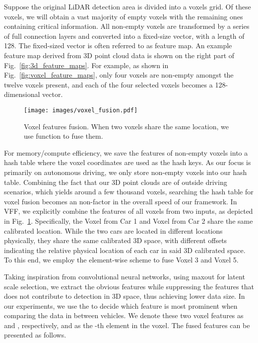 \documentclass[sigconf]{acmart}
\begin{document}
Suppose the original LiDAR detection area is divided into a voxels grid. Of these voxels, we will obtain a vast majority of empty voxels with the remaining ones containing critical information.
All non-empty voxels are transformed by a series of full connection layers and converted into a fixed-size vector, with a length of 128. 
The fixed-sized vector is often referred to as feature map.
An example feature map derived from 3D point cloud data is shown on the right part of Fig.~\ref{fig:3d_feature_maps}.
For example, as shown in Fig.~\ref{fig:voxel_feature_maps}, only four voxels are non-empty amongst the twelve voxels present, and each of the four selected voxels becomes a 128-dimensional vector.


\vspace{-11pt}
\begin{figure}[!h]
    \centering
    \texttt{[image: images/voxel\_fusion.pdf]}
    \caption{Voxel features fusion. When two voxels share the same location, we use  function to fuse them. }
    \vspace{-11pt}
    \label{fig:voxel_fusion}
\end{figure}


For memory/compute efficiency, we save the features of non-empty voxels into a hash table where the voxel coordinates are used as the hash keys. As our focus is primarily on autonomous driving, we only store non-empty voxels into our hash table. Combining the fact that our 3D point clouds are of outside driving scenarios, which yields around a few thousand voxels, searching the hash table for voxel fusion becomes an non-factor in the overall speed of our framework. 
In VFF, we explicitly combine the features of all voxels from two inputs, as depicted in Fig.~\ref{fig:voxel_fusion}.
Specifically, the Voxel  from Car 1 and Voxel  from Car 2 share the same calibrated location. 
While the two cars are located in different locations physically, they share the same calibrated 3D space, with different offsets indicating the relative physical location of each car in said 3D calibrated space.
To this end, we employ the element-wise  scheme to fuse Voxel 3 and Voxel 5. 


Taking inspiration from convolutional neural networks, using maxout \cite{goodfellow2013maxout} for latent scale selection, we extract the obvious features while suppressing the features that does not contribute to
detection in 3D space, thus achieving lower data size. In our experiments, we use the
 to decide which feature is most prominent when comparing the data in between vehicles.
We denote these two voxel features as  and , respectively, and  as the -th element in the voxel. 
The fused features  can be presented as follows.
\end{document}

